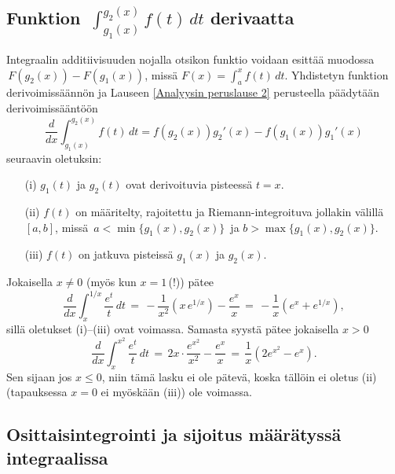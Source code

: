 \subsection*{Funktion $\,\int_{g_1(x)}^{g_2(x)} f(t)\,dt$ derivaatta}

Integraalin additiivisuuden nojalla otsikon funktio voidaan esittää muodossa \linebreak
$\,F(g_2(x))-F(g_1(x))$, missä $F(x)=\int_a^x f(t)\,dt$. Yhdistetyn funktion derivoimissäännön
ja Lauseen \ref{Analyysin peruslause 2} perusteella päädytään derivoimissääntöön
\[
\boxed{\quad \frac{d}{dx}\int_{g_1(x)}^{g_2(x)} f(t)\, dt 
                      = f(g_2(x))g_2'(x)-f(g_1(x))g_1'(x) \quad}
\]
seuraavin oletuksin:
\begin{itemize}
\item[(i)]   $g_1(t)$ ja $g_2(t)$ ovat derivoituvia pisteessä $t=x$.
\item[(ii)]  $f(t)$ on määritelty, rajoitettu ja Riemann-integroituva jollakin välillä $[a,b]$,
             missä $\,a<\min\{g_1(x),g_2(x)\}\,$ ja $b>\max\{g_1(x),g_2(x)\}$.
\item[(iii)] $f(t)$ on jatkuva pisteissä $g_1(x)$ ja $g_2(x)$.
\end{itemize}
\begin{Exa} Jokaisella $x \neq 0$ (myös kun $x=1$\,(!)) pätee
\[
\frac{d}{dx}\int_x^{1/x} \frac{e^t}{t}\,dt\,
               =\,-\frac{1}{x^2}\left(x\,e^{1/x}\right)-\frac{e^x}{x}\,
               =\,-\frac{1}{x}(e^x+e^{1/x}),
\]
sillä oletukset (i)--(iii) ovat voimassa. Samasta syystä pätee jokaisella $x>0$
\[
\frac{d}{dx}\int_x^{x^2} \frac{e^t}{t}\,dt\,
               =\,2x \cdot \frac{e^{x^2}}{x^2}-\frac{e^x}{x}\,
               =\,\frac{1}{x}(2e^{x^2}-e^x).
\]
Sen sijaan jos $x \le 0$, niin tämä lasku ei ole pätevä, koska tällöin ei oletus (ii) 
(tapauksessa $x=0$ ei myöskään (iii)) ole voimassa. \loppu
\end{Exa}

\subsection*{Osittaisintegrointi ja sijoitus määrätyssä integraalissa}


